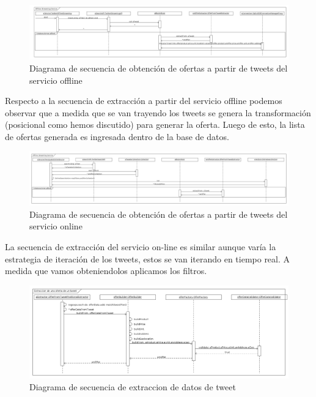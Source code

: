\begin{figure}[h]
\centerline{\includegraphics[keepaspectratio,width=\paperwidth,height=\paperheight,keepaspectratio,angle=90]{./imgs/sequence_diagram_offline_extraction.png}}
\caption{Diagrama de secuencia de obtención de ofertas a partir de tweets del servicio offline}
\label{fig:sequence_diagram_offline_extraction}
\end{figure}
Respecto a la secuencia de extracci\'on a partir del servicio offline podemos observar que a medida que se van trayendo los tweets se genera la transformaci\'on (posicional como hemos discutido) para generar la oferta. Luego de esto, la lista de ofertas generada es ingresada dentro de la base de datos.

\begin{figure}[h]
\centerline{\includegraphics[keepaspectratio,width=\paperwidth,height=\paperheight,keepaspectratio,angle=90]{./imgs/sequence_diagram_online_extraction.png}}
\caption{Diagrama de secuencia de obtención de ofertas a partir de tweets del servicio online}
\label{fig:sequence_diagram_online_extraction}
\end{figure}

La secuencia de extracci\'on del servicio on-line es similar aunque var\'ia la estrategia de iteraci\'on de los tweets, estos se van iterando en tiempo real. A medida que vamos obteniendolos aplicamos los filtros.



\begin{figure}[h]
\centerline{\includegraphics[width=0.9\paperwidth]{./imgs/sequence_diagram_parsing.png}}
\caption{Diagrama de secuencia de extraccion de datos de tweet}
\label{fig:secuence_parsing}
\end{figure}


